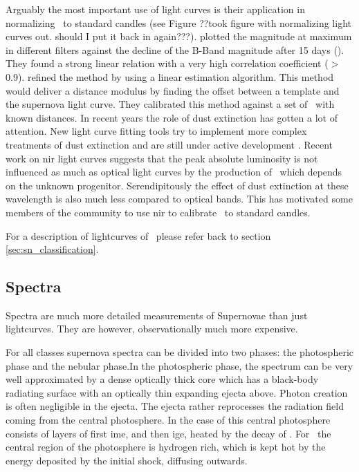 Arguably the most important use of light curves is their application in normalizing \sneia\ to standard candles (see Figure ??took figure with normalizing light curves out. should I put it back in again???). \citet[][]{1993ApJ...413L.105P} plotted the magnitude at maximum in different filters against the decline of the B-Band magnitude after 15 days (\dmb).  They found a strong linear relation with a very high correlation coefficient ($>$ 0.9). \cite{1995ApJ...438L..17R} refined the method by using a linear estimation algorithm. This method would deliver a distance modulus by finding the offset between a template and the supernova light curve. They calibrated this method against a set of \sneia\ with known distances. In recent years the role of dust extinction has gotten a lot of attention. New light curve fitting tools try to implement more complex treatments of dust extinction and are still under active development \cite[e.g.][]{2007ApJ...659..122J, 2007A&A...466...11G}. Recent work on \gls{nir} light curves \citep{2006ApJ...649..939K} suggests that the peak absolute luminosity is not influenced as much as optical light curves by the production of \Ni\ which depends on the unknown progenitor. Serendipitously the effect of dust extinction at these wavelength is also much less compared to optical bands. This has motivated some members of the community \citep[e.g.][]{2011ApJ...731..120M} to use \gls{nir} to calibrate \sneia\ to standard candles.

For a description of lightcurves of \sneii\ please refer back to section \ref{sec:sn_classification}.


\subsection{Spectra} 
\label{sec:intro_sn_spectra}
Spectra are much more detailed measurements of Supernovae than just lightcurves. They are however, observationally much more expensive. 

For all classes supernova spectra can be divided into two phases: the photospheric phase and the nebular phase.In the photospheric phase, the spectrum can be very well approximated by a dense optically thick core which has a black-body radiating surface with an optically thin expanding ejecta above. Photon creation is often negligible in the ejecta. The ejecta rather reprocesses the radiation field coming from the central photosphere. In the case of \sneia this central photosphere consists of layers of first \gls{ime}, and then \gls{ige}, heated by the decay of \Ni. For \sneii\ the central region of the photosphere is hydrogen rich, which is kept hot by the energy deposited by the initial shock, diffusing outwards. 


